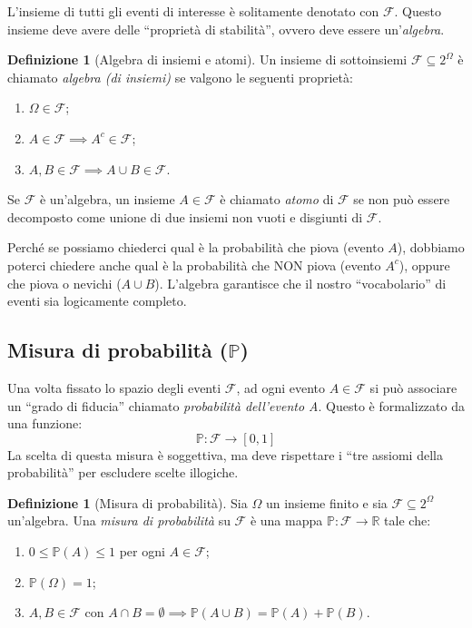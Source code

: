 \documentclass[11pt, a4paper]{report}
\theoremstyle{plain}
\theoremstyle{definition}
\newtheorem{definition}[theorem]{Definizione}
\theoremstyle{remark}
\newcommand{\PP}{\mathbb{P}}
\newcommand{\F}{\mathcal{F}}
\newcommand{\R}{\mathbb{R}}
\newcommand{\1}{\mathbf{1}}
\begin{document}
L'insieme di tutti gli eventi di interesse è solitamente denotato con $\F$. Questo insieme deve avere delle ``proprietà di stabilità'', ovvero deve essere un'\emph{algebra}.

\begin{definition}[Algebra di insiemi e atomi]
Un insieme di sottoinsiemi $\F \subseteq 2^\Omega$ è chiamato \emph{algebra (di insiemi)} se valgono le seguenti proprietà:
\begin{enumerate}[(F1)]
    \item $\Omega \in \F$;
    \item $A \in \F \implies A^c \in \F$;
    \item $A, B \in \F \implies A \cup B \in \F$.
\end{enumerate}
Se $\F$ è un'algebra, un insieme $A \in \F$ è chiamato \emph{atomo} di $\F$ se non può essere decomposto come unione di due insiemi non vuoti e disgiunti di $\F$.
\end{definition}

\begin{spiegazione}
    Perché se possiamo chiederci qual è la probabilità che piova (evento $A$), dobbiamo poterci chiedere anche qual è la probabilità che NON piova (evento $A^c$), oppure che piova o nevichi ($A \cup B$). L'algebra garantisce che il nostro ``vocabolario'' di eventi sia logicamente completo.
\end{spiegazione}

\subsection{Misura di probabilità \texorpdfstring{($\PP$)}{(P)}}

Una volta fissato lo spazio degli eventi $\F$, ad ogni evento $A \in \F$ si può associare un ``grado di fiducia'' chiamato \emph{probabilità dell'evento A}. Questo è formalizzato da una funzione:
\[ \PP : \F \to [0, 1] \]
La scelta di questa misura è soggettiva, ma deve rispettare i ``tre assiomi della probabilità'' per escludere scelte illogiche.

\begin{definition}[Misura di probabilità]
Sia $\Omega$ un insieme finito e sia $\F \subseteq 2^\Omega$ un'algebra. Una \emph{misura di probabilità} su $\F$ è una mappa $\PP : \F \to \R$ tale che:
\begin{enumerate}[(A1)]
    \item $0 \le \PP(A) \le 1$ per ogni $A \in \F$;
    \item $\PP(\Omega) = 1$;
    \item $A, B \in \F$ con $A \cap B = \emptyset \implies \PP(A \cup B) = \PP(A) + \PP(B)$.
\end{enumerate}
\end{definition}
\end{document}
